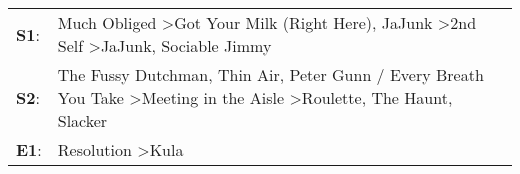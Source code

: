 \begin{supertabular}{p{0.03\textwidth}p{0.92\textwidth}}
 \textbf{S1}:  &                                                   Much Obliged\textsuperscript{} \textgreater \enspace Got Your Milk (Right Here)\textsuperscript{}, \enspace JaJunk\textsuperscript{} \textgreater \enspace 2nd Self\textsuperscript{} \textgreater \enspace JaJunk\textsuperscript{}, \enspace Sociable Jimmy\textsuperscript{}  \enspace  \\
 \textbf{S2}:  &  The Fussy Dutchman\textsuperscript{}, \enspace Thin Air\textsuperscript{}, \enspace Peter Gunn / Every Breath You Take\textsuperscript{} \textgreater \enspace Meeting in the Aisle\textsuperscript{} \textgreater \enspace Roulette\textsuperscript{}, \enspace The Haunt\textsuperscript{}, \enspace Slacker\textsuperscript{}  \enspace  \\
 \textbf{E1}:  &                                                                                                                                                                                                                                                         Resolution\textsuperscript{} \textgreater \enspace Kula\textsuperscript{}  \enspace  \\
\end{supertabular}

